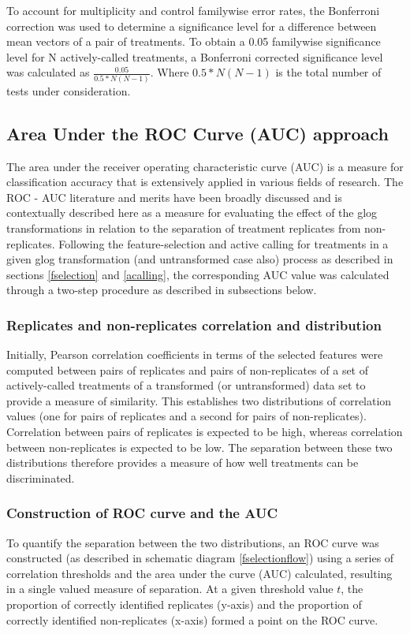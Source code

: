 \documentclass[11pt]{article}
\begin{document}
\par{To account for multiplicity and control familywise error rates, the Bonferroni correction was used to determine a significance level for a difference between mean vectors of a pair of treatments. To obtain a 0.05 familywise significance level for N actively-called treatments, a Bonferroni corrected significance level was calculated as $\frac{0.05}{0.5*N(N-1)}$. Where $0.5*N(N-1)$ is the total number of tests under consideration. }

\subsection{Area Under the ROC Curve (AUC) approach} \label{auc}
\par{The area under the receiver operating characteristic curve (AUC) is a measure for classification accuracy that is extensively applied in various fields of research. The ROC - AUC literature and merits have been broadly discussed  \cite{Metz1978, Hanley1982,Hanley1989, Zweig1993, Hand2009} and is contextually described here as a measure for evaluating the effect of the glog transformations in relation to the separation of treatment replicates from non-replicates. Following the feature-selection and active calling for treatments in a given glog transformation (and untransformed case also) process as described in sections \ref{fselection} and \ref{acalling}, the corresponding AUC value was calculated through a two-step procedure as described in subsections below. }

\subsubsection*{Replicates and non-replicates correlation and distribution}
\par{Initially, Pearson correlation coefficients in terms of the selected features were computed between pairs of replicates and pairs of non-replicates of a set of actively-called treatments of a transformed (or untransformed) data set to provide a measure of similarity. This establishes two distributions of correlation values (one for pairs of replicates and a second for pairs of non-replicates). Correlation between pairs of replicates is expected to be high, whereas correlation between non-replicates is expected to be low. The separation between these two distributions therefore provides a measure of how well treatments can be discriminated.}
\subsubsection*{Construction of ROC curve and the AUC}
\par{To quantify the separation between the two distributions, an ROC curve was constructed (as described in schematic diagram \ref{fselectionflow}) using a series of correlation thresholds and the area under the curve (AUC) calculated, resulting in a single valued measure of separation. At a given threshold value $t$, the proportion of correctly identified replicates (y-axis) and the proportion of correctly identified non-replicates (x-axis) formed a point on the ROC curve.}
\end{document}
